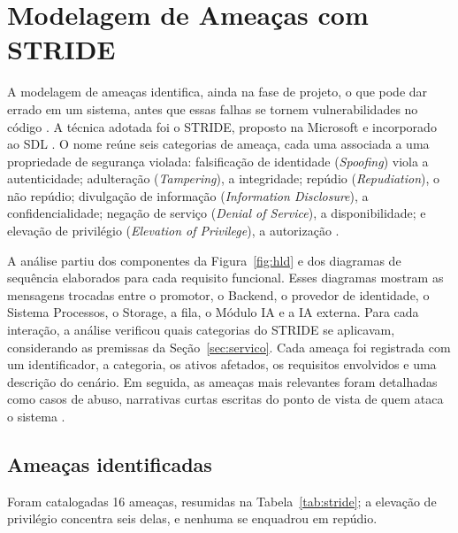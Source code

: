 \documentclass[12pt]{article}
\begin{document}
    \section{Modelagem de Ameaças com STRIDE}
    \label{sec:stride}

    A modelagem de ameaças identifica, ainda na fase de projeto, o que pode dar errado em um sistema, antes que essas falhas se tornem vulnerabilidades no código \cite{shostack:14,xiong:19}.
    A técnica adotada foi o STRIDE, proposto na Microsoft \cite{kohnfelder:99} e incorporado ao SDL \cite{howard:06}.
    O nome reúne seis categorias de ameaça, cada uma associada a uma propriedade de segurança violada: falsificação de identidade (\textit{Spoofing}) viola a autenticidade; adulteração (\textit{Tampering}), a integridade; repúdio (\textit{Repudiation}), o não repúdio; divulgação de informação (\textit{Information Disclosure}), a confidencialidade; negação de serviço (\textit{Denial of Service}), a disponibilidade; e elevação de privilégio (\textit{Elevation of Privilege}), a autorização \cite{shostack:14}.

    A análise partiu dos componentes da Figura~\ref{fig:hld} e dos diagramas de sequência elaborados para cada requisito funcional. Esses diagramas mostram as mensagens trocadas entre o promotor, o Backend, o provedor de identidade, o Sistema Processos, o Storage, a fila, o Módulo IA e a IA externa. Para cada interação, a análise verificou quais categorias do STRIDE se aplicavam, considerando as premissas da Seção~\ref{sec:servico}. Cada ameaça foi registrada com um identificador, a categoria, os ativos afetados, os requisitos envolvidos e uma descrição do cenário. Em seguida, as ameaças mais relevantes foram detalhadas como casos de abuso, narrativas curtas escritas do ponto de vista de quem ataca o sistema \cite{mcdermott:99,sindre:05}.

    \subsection{Ameaças identificadas}

    Foram catalogadas 16 ameaças, resumidas na Tabela~\ref{tab:stride}; a elevação de privilégio concentra seis delas, e nenhuma se enquadrou em repúdio.
\end{document}
